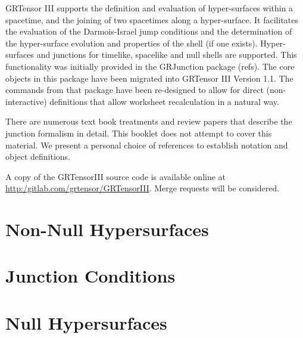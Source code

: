 \documentclass{article}
\begin{document}
\grtitle{\grHyperTitle}
\grlabel{\grHyperLabel}
\grtitlepage
%
\copyrightpage
\noindent 
GRTensor III supports the definition and evaluation of hyper-surfaces within a spacetime, and the joining
of two spacetimes along a hyper-surface. It facilitates the evaluation of the Darmois-Israel jump conditions
and the determination of the hyper-surface evolution and properties of the shell (if one exists). 
Hyper-surfaces and junctions for timelike, spacelike and null shells are supported. This functionality was
initially provided in the GRJunction package (refs). The core objects in this package have been migrated 
into GRTensor III Version 1.1. The commands from that package have been re-designed to allow for
direct (non-interactive) definitions that allow worksheet recalculation in a natural way.

There are numerous text book treatments and review papers that describe the junction formalism in detail. This
booklet does not attempt to cover this material. We present a personal choice of references to establish notation
and object definitions.

A copy of the GRTensorIII source code is available online at 
\href{url}{http:/gitlab.com/grtensor/GRTensorIII}. Merge requests
will be considered. 

%
\section{Non-Null Hypersurfaces}


\section{Junction Conditions}

\section{Null Hypersurfaces}

\vfill


\end{document}
